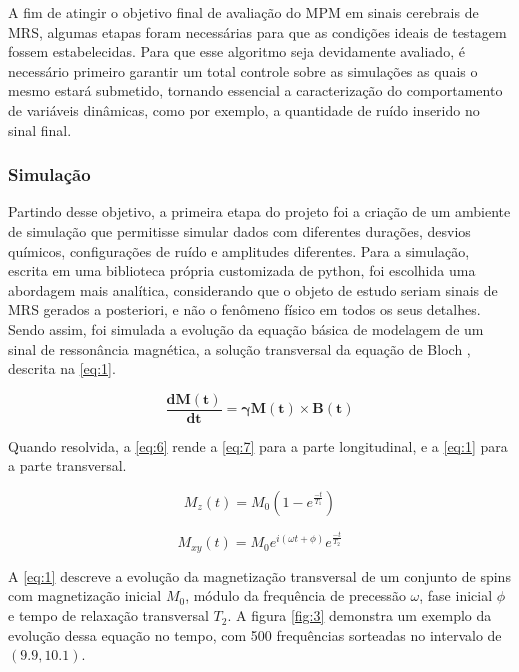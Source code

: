 \documentclass[
12pt,		
twoside, 
a4paper,
chapter=TITLE,
english,			
brazil]{USPSC-classe/USPSC}
\begin{document}
A fim de atingir o objetivo final de avaliação do MPM em sinais cerebrais de MRS, algumas etapas foram 
necessárias para que as condições ideais de testagem fossem estabelecidas. Para que esse algoritmo 
seja devidamente avaliado, é necessário primeiro garantir um total controle sobre as simulações as quais o mesmo estará submetido,
tornando essencial a caracterização do comportamento de variáveis dinâmicas, como por exemplo, a quantidade de ruído inserido no sinal final.


\subsubsection{Simulação}

Partindo desse objetivo, a primeira etapa do projeto foi a criação de um ambiente de simulação
que permitisse simular dados com diferentes durações, desvios químicos, configurações de ruído e amplitudes diferentes. Para a simulação, escrita em uma biblioteca 
própria customizada de python, foi escolhida uma abordagem mais analítica, considerando que o objeto de estudo seriam
sinais de MRS gerados a posteriori, e não o fenômeno físico em todos os seus detalhes. Sendo assim, foi simulada a evolução 
da equação básica de modelagem de um sinal de ressonância magnética, a solução transversal da equação de Bloch \cite{PhysRev.70.460}, 
descrita na \autoref{eq:1}.

\begin{equation} \label{eq:6}
    \mathbf{\frac{dM(t)}{dt}} = \mathbf{\gamma M(t)} \times \mathbf{B(t)}
\end{equation}

Quando resolvida, a \autoref{eq:6} rende a \autoref{eq:7} para a parte longitudinal, e a \autoref{eq:1} para a parte transversal.

\begin{equation} \label{eq:7}
    M_z(t) = M_0 (1 - e^{\frac{-t}{T_1}})
\end{equation}

\begin{equation} \label{eq:1}
    M_{xy}(t) = M_0 e^{i(\omega t + \phi)} e^{\frac{-t}{T_2}}
\end{equation}

A \autoref{eq:1} descreve a evolução da magnetização transversal de um conjunto de spins com magnetização inicial $M_0$, módulo da frequência de precessão $\omega$, fase inicial $\phi$ e tempo 
de relaxação transversal $T_2$. A figura \autoref{fig:3} demonstra um exemplo da evolução dessa equação no tempo, com 500 frequências sorteadas no intervalo de $(9.9, 10.1)$.  
\end{document}
